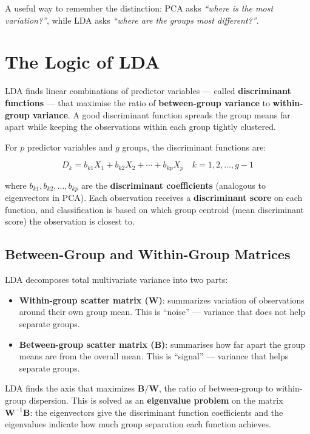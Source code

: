 \documentclass[
]{book}
\providecommand{\tightlist}{%
  \setlength{\itemsep}{0pt}\setlength{\parskip}{0pt}}
\begin{document}
A useful way to remember the distinction: PCA asks \emph{``where is the most variation?''}, while LDA asks \emph{``where are the groups most different?''}.

\section{The Logic of LDA}\label{the-logic-of-lda}

LDA finds linear combinations of predictor variables --- called \textbf{discriminant functions} --- that maximise the ratio of \textbf{between-group variance} to \textbf{within-group variance}. A good discriminant function spreads the group means far apart while keeping the observations within each group tightly clustered.

For \(p\) predictor variables and \(g\) groups, the discriminant functions are:

\[D_k = b_{k1}X_1 + b_{k2}X_2 + \cdots + b_{kp}X_p \quad k = 1, 2, \ldots, g-1\]

where \(b_{k1}, b_{k2}, \ldots, b_{kp}\) are the \textbf{discriminant coefficients} (analogous to eigenvectors in PCA). Each observation receives a \textbf{discriminant score} on each function, and classification is based on which group centroid (mean discriminant score) the observation is closest to.

\subsection{Between-Group and Within-Group Matrices}\label{between-group-and-within-group-matrices}

LDA decomposes total multivariate variance into two parts:

\begin{itemize}
\tightlist
\item
  \textbf{Within-group scatter matrix (\(\mathbf{W}\))}: summarizes variation of observations around their own group mean. This is ``noise'' --- variance that does not help separate groups.
\item
  \textbf{Between-group scatter matrix (\(\mathbf{B}\))}: summarises how far apart the group means are from the overall mean. This is ``signal'' --- variance that helps separate groups.
\end{itemize}

LDA finds the axis that maximizes \(\mathbf{B} / \mathbf{W}\), the ratio of between-group to within-group dispersion. This is solved as an \textbf{eigenvalue problem} on the matrix \(\mathbf{W}^{-1}\mathbf{B}\): the eigenvectors give the discriminant function coefficients and the eigenvalues indicate how much group separation each function achieves.
\end{document}
